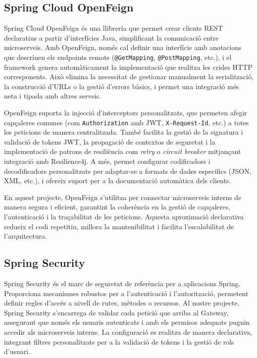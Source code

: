 \subsection*{Spring Cloud OpenFeign}
Spring Cloud OpenFeign és una llibreria que permet crear clients REST declaratius a partir d'interfícies Java, simplificant la comunicació entre microserveis. Amb OpenFeign, només cal definir una interfície amb anotacions que descriuen els endpoints remots (\texttt{@GetMapping}, \texttt{@PostMapping}, etc.), i el framework genera automàticament la implementació que realitza les crides HTTP corresponents. Això elimina la necessitat de gestionar manualment la serialització, la construcció d'URLs o la gestió d'errors bàsics, i permet una integració més neta i tipada amb altres serveis.

OpenFeign suporta la injecció d'interceptors personalitzats, que permeten afegir capçaleres comunes (com \texttt{Authorization} amb JWT, \texttt{X-Request-Id}, etc.) a totes les peticions de manera centralitzada. També facilita la gestió de la signatura i validació de tokens JWT, la propagació de contextos de seguretat i la implementació de patrons de resiliència com \emph{retry} o \emph{circuit breaker} mitjançant integració amb Resilience4j. A més, permet configurar codificadors i decodificadors personalitzats per adaptar-se a formats de dades específics (JSON, XML, etc.), i ofereix suport per a la documentació automàtica dels clients.

En aquest projecte, OpenFeign s'utilitza per connectar microserveis interns de manera segura i eficient, garantint la coherència en la gestió de capçaleres, l'autenticació i la traçabilitat de les peticions. Aquesta aproximació declarativa redueix el codi repetitiu, millora la mantenibilitat i facilita l'escalabilitat de l'arquitectura.

\subsection*{Spring Security}
Spring Security és el marc de seguretat de referència per a aplicacions Spring. Proporciona mecanismes robustos per a l'autenticació i l'autorització, permetent definir regles d'accés a nivell de rutes, mètodes o recursos. Al nostre projecte, Spring Security s'encarrega de validar cada petició que arriba al Gateway, assegurant que només els usuaris autenticats i amb els permisos adequats puguin accedir als microserveis interns. La configuració es realitza de manera declarativa, integrant filtres personalitzats per a la validació de tokens i la gestió de rols d'usuari.

